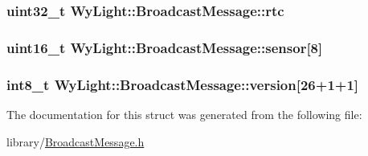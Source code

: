 \hypertarget{struct_wy_light_1_1_broadcast_message_a4cc5a5b440dc793d0ca62b512fd0ca3c}{
\subsubsection[{rtc}]{\setlength{\rightskip}{0pt plus 5cm}uint32\-\_\-t Wy\-Light\-::\-Broadcast\-Message\-::rtc}}\label{struct_wy_light_1_1_broadcast_message_a4cc5a5b440dc793d0ca62b512fd0ca3c}
\hypertarget{struct_wy_light_1_1_broadcast_message_ac999a8e5814f990c66a07b448d961095}{
\subsubsection[{sensor}]{\setlength{\rightskip}{0pt plus 5cm}uint16\-\_\-t Wy\-Light\-::\-Broadcast\-Message\-::sensor\mbox{[}8\mbox{]}}}\label{struct_wy_light_1_1_broadcast_message_ac999a8e5814f990c66a07b448d961095}
\hypertarget{struct_wy_light_1_1_broadcast_message_a0a8793ce043e90aab098589663d2284c}{
\subsubsection[{version}]{\setlength{\rightskip}{0pt plus 5cm}int8\-\_\-t Wy\-Light\-::\-Broadcast\-Message\-::version\mbox{[}26+1+1\mbox{]}}}\label{struct_wy_light_1_1_broadcast_message_a0a8793ce043e90aab098589663d2284c}


The documentation for this struct was generated from the following file\-:\begin{DoxyCompactItemize}
\item 
library/\hyperlink{_broadcast_message_8h}{Broadcast\-Message.\-h}\end{DoxyCompactItemize}
